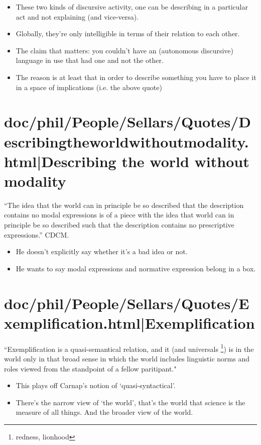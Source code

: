 \documentclass[12pt,a4paper]{report}
\begin{document}
\begin{itemize}
    \item  These two kinds of discursive activity, one can be describing in a
           particular act and not explaining (and vice-versa).
    \item Globally, they're only intelligible in terms of their relation to
          each other.
    \item The claim that matters: you couldn't have an  (autonomous discursive)
          language in use that had one and not the other.
    \item The reason is at least that in order to describe something you have
          to place it in a space of implications (i.e. the above quote)
\end{itemize}
\chapter{doc/phil/People/Sellars/Quotes/Describingtheworldwithoutmodality.html|Describing the world without modality}
``The idea that the world can in principle be so described that the description
contains no modal expressions is of a piece with the idea that world can in
principle be so described such that the description contains no prescriptive
expressions.'' CDCM.

\begin{itemize}
    \item He doesn't explicitly say whether it's a bad idea or not.
    \item He wants to say modal expressions and normative expression belong in
          a box.
\end{itemize}
\chapter{doc/phil/People/Sellars/Quotes/Exemplification.html|Exemplification}
``Exemplification is a quasi-semantical relation, and it (and universals
\footnote{redness, lionhood}) is in the world only in that broad sense in which the
world includes linguistic norms and roles viewed from the standpoint of a
fellow paritipant."

\begin{itemize}
    \item This plays off Carnap's notion of `quasi-syntactical'.
    \item There's the narrow view of `the world', that's the world that science
          is the measure of all things. And the broader view of the world.
\end{itemize}
\end{document}
